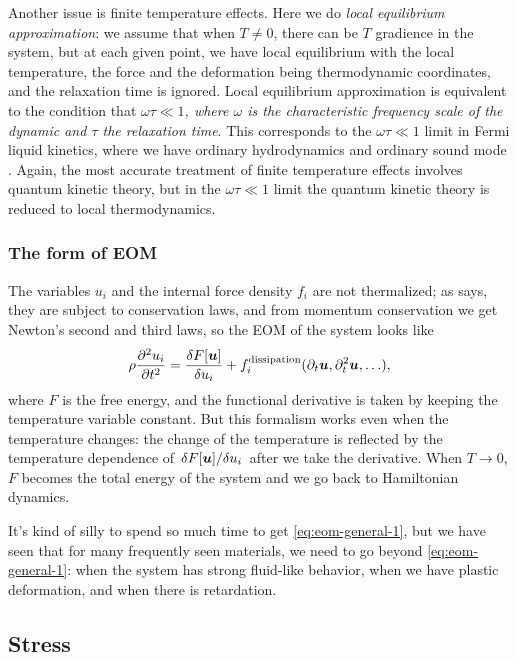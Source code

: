\documentclass[hyperref, a4paper]{article}
\begin{document}
Another issue is finite temperature effects. 
Here we do \emph{local equilibrium approximation}:
we assume that when $T \neq 0$,
there can be $T$ gradience in the system,
but at each given point, 
we have local equilibrium with the local temperature, the force and the deformation
being thermodynamic coordinates,
and the relaxation time is ignored.
Local equilibrium approximation is equivalent to the 
condition that \emph{$\omega \tau \ll 1$,
where $\omega$ is the characteristic frequency scale of the dynamic
and $\tau$ the relaxation time}.
This corresponds to the $\omega \tau \ll 1$ limit in Fermi liquid kinetics,
where we have ordinary hydrodynamics and ordinary sound mode \cite{belitz2022soft}.
Again, the most accurate treatment of finite temperature effects involves 
quantum kinetic theory,
but in the $\omega \tau \ll 1$ limit 
the quantum kinetic theory is reduced to local thermodynamics.

\subsubsection{The form of EOM}

The variables $u_i$ and the internal force density $f_i$ are not thermalized;
as \cite{belitz2022soft} says, 
they are subject to conservation laws,
and from momentum conservation we get Newton's second and third laws, 
so the EOM of the system looks like 
\begin{equation}
    \rho \pdv[2]{u_i}{t} = \fdv{F[\vb*{u}]}{u_i} + f^{\text{dissipation}}_i(\partial_t \vb*{u}, \partial_t^2 \vb*{u}, \ldots),
    \label{eq:eom-general-1}
\end{equation}
where $F$ is the free energy,
and the functional derivative is taken by keeping the temperature variable constant. 
But this formalism works even when the temperature changes:
the change of the temperature is reflected by the temperature dependence
of $\fdv*{F[\vb*{u}]}{u_i}$ after we take the derivative.
When $T \to 0$, $F$ becomes the total energy of the system 
and we go back to Hamiltonian dynamics.

It's kind of silly to spend so much time 
to get \eqref{eq:eom-general-1},
but we have seen that for many frequently seen materials,
we need to go beyond \eqref{eq:eom-general-1}:
when the system has strong fluid-like behavior,
when we have plastic deformation,
and when there is retardation.

\subsection{Stress}
\end{document}

